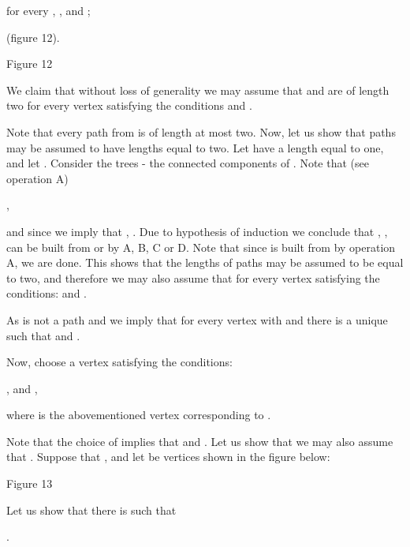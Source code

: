 \documentclass{article}
\begin{document}
\begin{center}
for every  , ,  and ;

 (figure 12).


Figure 12\bigskip
\end{center}

We claim that without loss of generality we may assume that  and  are of length two for every vertex  satisfying the
conditions  and .

Note that every path from  is of length at most two. Now,
let us show that paths  may be assumed to have lengths
equal to two. Let  have a length equal to one, and let . Consider the trees  - the connected
components of . Note that (see
operation A)

\begin{center}
,
\end{center}

and since  we imply that , . Due to hypothesis of induction we conclude that , , can be built from  or  by A, B, C or D. Note
that since  is built from  by
operation A, we are done. This shows that the lengths of paths  may be assumed to be equal to two, and therefore we may
also assume that  for every vertex  satisfying the
conditions:  and .

As  is not a path and  we imply that for every
vertex  with  and 
there is a unique  such that 
and .

Now, choose a vertex  satisfying the conditions:

\begin{center}
,  and ,
\end{center}

where  is the abovementioned vertex corresponding to .

Note that the choice of  implies that  and . Let us show that we may also assume that . Suppose that , and let  be vertices shown in the figure below:

\begin{center}

Figure 13\bigskip
\end{center}

Let us show that there is  such that

\begin{center}
.
\end{center}
\end{document}
